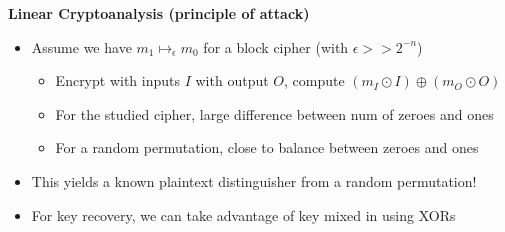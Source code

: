 \textbf{Linear Cryptoanalysis (principle of attack)}
\begin{itemize}
    \item Assume we have $m_1 \mapsto_{\epsilon} m_0$ for a block cipher (with $\epsilon >> 2^{-n}$)
    \begin{itemize}
        \item Encrypt with inputs $I$ with output $O$, compute $(m_I \odot I) \oplus (m_O \odot O)$
        \item For the studied cipher, large difference between num of zeroes and ones
        \item For a random permutation, close to balance between zeroes and ones
    \end{itemize}
    \item This yields a known plaintext distinguisher from a random permutation!
    \item For key recovery, we can take advantage of key mixed in using XORs\newline
\end{itemize}

